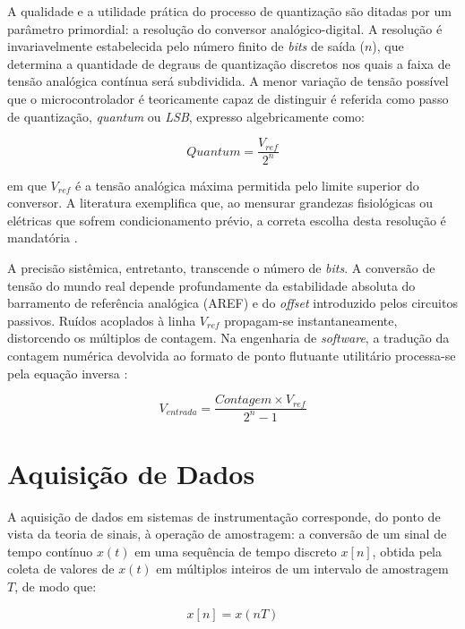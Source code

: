 A qualidade e a utilidade prática do processo de quantização são ditadas por um parâmetro primordial: a resolução do conversor analógico-digital. A resolução é invariavelmente estabelecida pelo número finito de \textit{bits} de saída ($n$), que determina a quantidade de degraus de quantização discretos nos quais a faixa de tensão analógica contínua será subdividida. A menor variação de tensão possível que o microcontrolador é teoricamente capaz de distinguir é referida como passo de quantização, \textit{quantum} ou \textit{LSB}, expresso algebricamente como:

\begin{equation}
    Quantum = \frac{V_{ref}}{2^n}
\end{equation}

em que $V_{ref}$ é a tensão analógica máxima permitida pelo limite superior do conversor. A literatura exemplifica que, ao mensurar grandezas fisiológicas ou elétricas que sofrem condicionamento prévio, a correta escolha desta resolução é mandatória \cite{Patterson2014, Kester2005}.

A precisão sistêmica, entretanto, transcende o número de \textit{bits}. A conversão de tensão do mundo real depende profundamente da estabilidade absoluta do barramento de referência analógica (AREF) e do \textit{offset} introduzido pelos circuitos passivos. Ruídos acoplados à linha $V_{ref}$ propagam-se instantaneamente, distorcendo os múltiplos de contagem. Na engenharia de \textit{software}, a tradução da contagem numérica devolvida ao formato de ponto flutuante utilitário processa-se pela equação inversa \cite{Kester2005, ScienceDirect2025}:

\begin{equation}
    V_{entrada} = \frac{Contagem \times V_{ref}}{2^{n}-1}
\end{equation}

\section{Aquisição de Dados}
A aquisição de dados em sistemas de instrumentação corresponde, do ponto de vista da teoria de sinais, à operação de amostragem: a conversão de um sinal de tempo contínuo $x(t)$ em uma sequência de tempo discreto $x[n]$, obtida pela coleta de valores de $x(t)$ em múltiplos inteiros de um intervalo de amostragem $T$, de modo que:

\begin{equation}
    x[n] = x(nT)
\end{equation}

